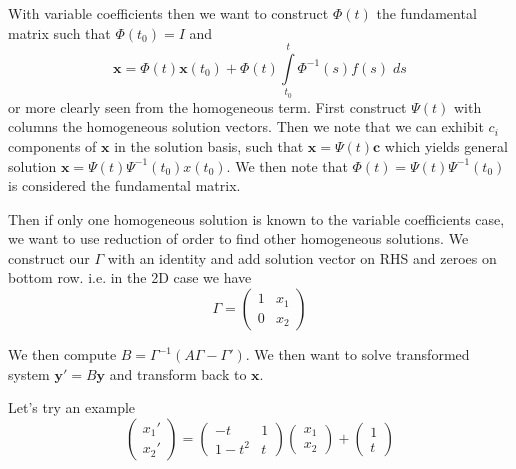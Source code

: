\documentclass[10pt]{report}
\begin{document}
With variable coefficients then we want to construct $\Phi(t)$ the fundamental matrix such that $\Phi(t_0) = I$ and
$$\mathbf{x} = \Phi(t) \mathbf{x}(t_0) + \Phi(t)\displaystyle\int\limits_{t_0}^{t}\Phi^{-1}(s)f(s)\;ds$$
or more clearly seen from the homogeneous term. First construct $\Psi(t)$ with columns the homogeneous solution vectors. Then we note that we can exhibit $c_i$ components of $\mathbf{x}$ in the solution basis, such that $\mathbf{x} = \Psi(t) \mathbf{c}$ which yields general solution $\mathbf{x} = \Psi(t) \Psi^{-1}(t_0)x(t_0)$. We then note that $\Phi(t) = \Psi(t)\Psi^{-1}(t_0)$ is considered the fundamental matrix.

Then if only one homogeneous solution is known to the variable coefficients case, we want to use reduction of order to find other homogeneous solutions. We construct our $\Gamma$ with an identity and add solution vector on RHS and zeroes on bottom row. i.e. in the 2D case we have
\begin{equation}
    \Gamma = \begin{pmatrix} 1 & x_1\\0 & x_2 \end{pmatrix} 
\end{equation}

We then compute $B = \Gamma^{-1}(A\Gamma - \Gamma')$. We then want to solve transformed system $\mathbf{y}' = B\mathbf{y}$ and transform back to $\mathbf{x}$. 

Let's try an example
\begin{equation}
    \begin{pmatrix} x_1'\\x_2' \end{pmatrix} =\begin{pmatrix} -t & 1 \\ 1-t^2 & t \end{pmatrix} \begin{pmatrix} x_1\\x_2 \end{pmatrix}  + \begin{pmatrix} 1\\t \end{pmatrix} 
\end{equation}
\end{document}
